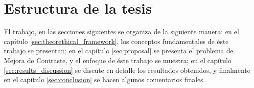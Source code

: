 \section{Estructura de la tesis}
El trabajo, en las secciones siguientes se organiza de la siguiente manera: en el capítulo \ref{sec:theorethical_framework}, los conceptos fundamentales de éste trabajo se presentan; en el capítulo \ref{sec:proposal} se presenta el problema de Mejora de Contraste, y el enfoque de éste trabajo se muestra; en el capítulo \ref{sec:results_discussion} se discute en detalle los resultados obtenidos, y finalmente en el capítulo \ref{sec:conclusion} se hacen algunos comentarios finales.
